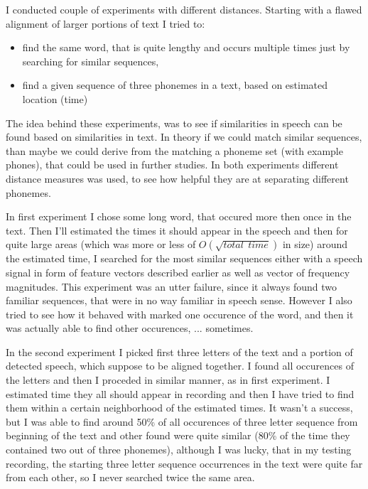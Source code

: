 \documentclass[12pt,a4paper,english]{article}
\begin{document}
I conducted couple of experiments with different distances.
Starting with a flawed alignment of larger portions of text I tried to:
\begin{itemize}
	\item find the same word, that is quite lengthy and occurs multiple times just by searching for similar sequences,
	\item find a given sequence of three phonemes in a text, based on estimated location (time)
\end{itemize}
The idea behind these experiments, was to see if similarities in speech can be found based on similarities in text.
In theory if we could match similar sequences, than maybe we could derive from the matching a phoneme set (with example phones), that could be used in further studies. \newline
In both experiments different distance measures was used, to see how helpful they are at separating different phonemes. \newline

In first experiment I chose some long word, that occured more then once in the text. Then I'll estimated the times it should appear in the speech and then for quite large areas (which was more or less of $O(\sqrt{total \: \: time})$ in size) around the estimated time, I searched for the most similar sequences either with a speech signal in form of feature vectors described earlier as well as vector of frequency magnitudes. \newline
This experiment was an utter failure, since it always found two familiar sequences, that were in no way familiar in speech sense.
However I also tried to see how it behaved with marked one occurence of the word, and then it was actually able to find other occurences, ... sometimes. \newline

In the second experiment I picked first three letters of the text and a portion of detected speech, which suppose to be aligned together. I found all occurences of the letters and then I proceded in similar manner, as in first experiment. I estimated time they all should appear in recording and then I have tried to find them within a certain neighborhood of the estimated times. It wasn't a success, but I was able to find around 50\% of all occurences of three letter sequence from beginning of the text and other found were quite similar (80\% of the time they contained two out of three phonemes), although I was lucky, that in my testing recording, the starting three letter sequence occurrences in the text were quite far from each other, so I never searched twice the same area. \newline
\end{document}

